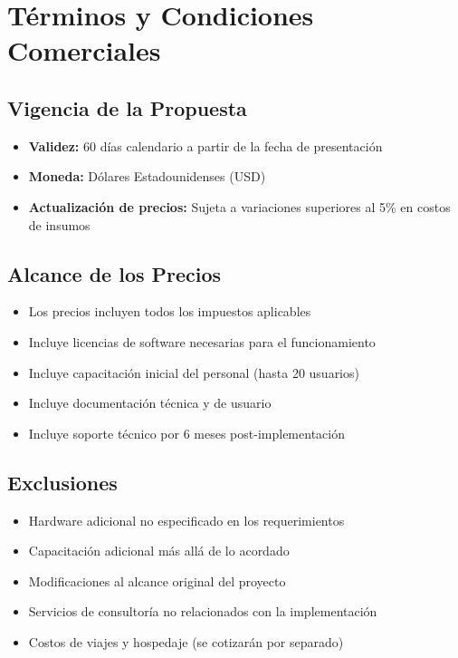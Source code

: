 \section{Términos y Condiciones Comerciales}

\subsection{Vigencia de la Propuesta}
\begin{itemize}
    \item \textbf{Validez:} 60 días calendario a partir de la fecha de presentación
    \item \textbf{Moneda:} Dólares Estadounidenses (USD)
    \item \textbf{Actualización de precios:} Sujeta a variaciones superiores al 5\% en costos de insumos
\end{itemize}

\subsection{Alcance de los Precios}
\begin{itemize}
    \item Los precios incluyen todos los impuestos aplicables
    \item Incluye licencias de software necesarias para el funcionamiento
    \item Incluye capacitación inicial del personal (hasta 20 usuarios)
    \item Incluye documentación técnica y de usuario
    \item Incluye soporte técnico por 6 meses post-implementación
\end{itemize}

\subsection{Exclusiones}
\begin{itemize}
    \item Hardware adicional no especificado en los requerimientos
    \item Capacitación adicional más allá de lo acordado
    \item Modificaciones al alcance original del proyecto
    \item Servicios de consultoría no relacionados con la implementación
    \item Costos de viajes y hospedaje (se cotizarán por separado)
\end{itemize}

